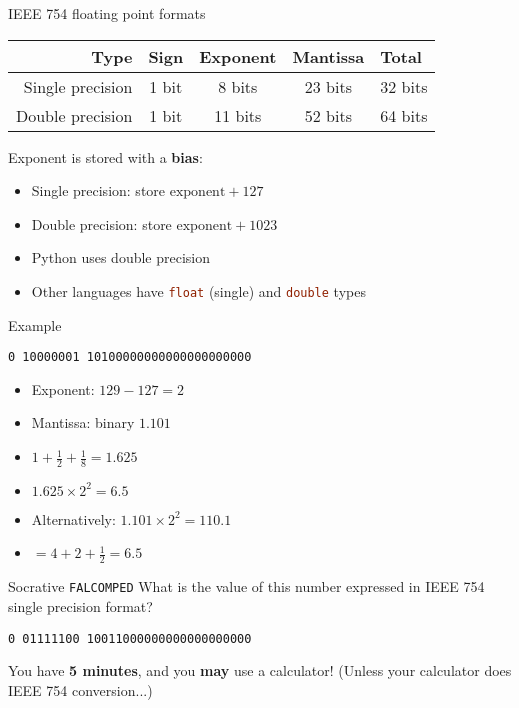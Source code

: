 \begin{frame}[fragile]{IEEE 754 floating point formats}
	\begin{center}
		\begin{tabular}{|r|ccc|l|}
			\hline
			Type & Sign & Exponent & Mantissa & Total \\\hline
			Single precision & 1 bit & 8 bits & 23 bits & 32 bits \\\hline
			Double precision & 1 bit & 11 bits & 52 bits & 64 bits \\\hline
		\end{tabular}
	\end{center}
	\pause
	Exponent is stored with a \textbf{bias}:
	\begin{itemize}
		\item Single precision: store $\text{exponent} + 127$
		\item Double precision: store $\text{exponent} + 1023$
	\end{itemize}
	\begin{itemize}
		\pause\item Python uses double precision
		\pause\item Other languages have \lstinline[language=C]{float} (single) and \lstinline[language=C]{double} types
	\end{itemize}
\end{frame}

\begin{frame}{Example}
	\pause
	\begin{center}
		\texttt{0 10000001 10100000000000000000000}
	\end{center}
	\begin{itemize}
		\pause\item Exponent: $129 - 127 = 2$
		\pause\item Mantissa: binary $1.101$
		\pause\item $1 + \frac12 + \frac18 = 1.625$
		\pause\item $1.625 \times 2^2 = 6.5$
		\pause\item Alternatively: $1.101 \times 2^2 = 110.1$
		\pause\item $= 4 + 2 + \frac12 = 6.5$
	\end{itemize}
\end{frame}

\begin{frame}{Socrative \texttt{FALCOMPED}}
	\pause
	What is the value of this number expressed in IEEE 754 single precision format?
	\begin{center}
		\texttt{0 01111100 10011000000000000000000}
	\end{center}
	You have \textbf{5 minutes}, and you \textbf{may} use a calculator!
	(Unless your calculator does IEEE 754 conversion...)
\end{frame}

